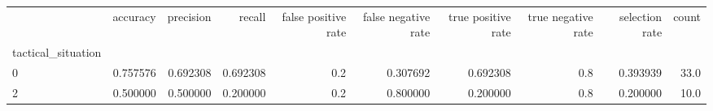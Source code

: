 \begin{tabular}{lrrrrrrrrr}
\toprule
{} &  accuracy &  precision &    recall &  false positive rate &  false negative rate &  true positive rate &  true negative rate &  selection rate &  count \\
tactical\_situation &           &            &           &                      &                      &                     &                     &                 &        \\
\midrule
0                  &  0.757576 &   0.692308 &  0.692308 &                  0.2 &             0.307692 &            0.692308 &                 0.8 &        0.393939 &   33.0 \\
2                  &  0.500000 &   0.500000 &  0.200000 &                  0.2 &             0.800000 &            0.200000 &                 0.8 &        0.200000 &   10.0 \\
\bottomrule
\end{tabular}
